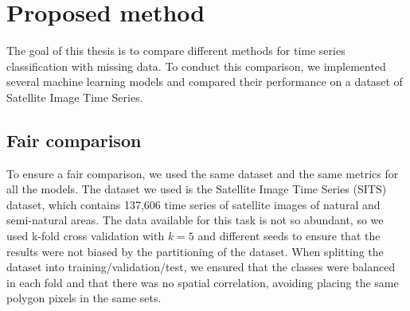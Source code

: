 \chapter{Proposed method}
The goal of this thesis is to compare different methods for time series classification with missing data.
To conduct this comparison, we implemented several machine learning models and compared their performance on a dataset of Satellite Image Time Series.

\section{Fair comparison}
To ensure a fair comparison, we used the same dataset and the same metrics for all the models.
The dataset we used is the Satellite Image Time Series (SITS) dataset, which contains 137,606 time series of satellite images of natural and semi-natural areas. 
The data available for this task is not so abundant, so we used k-fold cross validation with $k=5$ and different seeds to ensure that the results were not biased by the partitioning of the dataset.
When splitting the dataset into training/validation/test, we ensured that the classes were balanced in each fold and that there was no spatial correlation, avoiding placing the same polygon pixels in the same sets.

